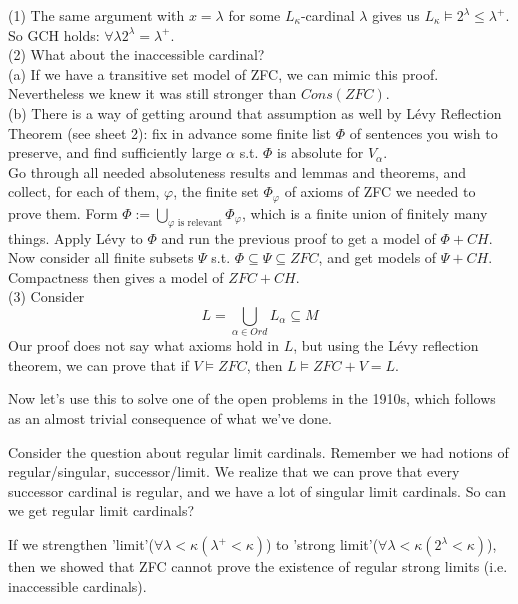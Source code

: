 \documentclass[a4paper]{article}
\begin{document}
\begin{rem}
(1) The same argument with $x=\lambda$ for some $L_\kappa$-cardinal $\lambda$ gives us $L_\kappa \vDash 2^\lambda \leq \lambda^+$. So GCH holds: $\forall \lambda 2^\lambda = \lambda^+$.\\
(2) What about the inaccessible cardinal?\\
(a) If we have a transitive set model of ZFC, we can mimic this proof. Nevertheless we knew it was still stronger than $Cons(ZFC)$.\\
(b) There is a way of getting around that assumption as well by L\'{e}vy Reflection Theorem (see sheet 2): fix in advance some finite list $\Phi$ of sentences you wish to preserve, and find sufficiently large $\alpha$ s.t. $\Phi$ is absolute for $V_\alpha$.\\
Go through all needed absoluteness results and lemmas and theorems, and collect, for each of them, $\varphi$, the finite set $\Phi_\varphi$ of axioms of ZFC we needed to prove them. Form $\Phi:=\bigcup_{\varphi \text{ is relevant}} \Phi_\varphi$, which is a finite union of finitely many things. Apply L\'{e}vy to $\Phi$ and run the previous proof to get a model of $\Phi+CH$.\\
Now consider all finite subsets $\Psi$ s.t. $\Phi \subseteq \Psi \subseteq ZFC$, and get models of $\Psi+CH$. Compactness then gives a model of $ZFC+CH$.\\
(3) Consider 
\[
L=\bigcup_{\alpha \in Ord} L_\alpha \subseteq M
\]
Our proof does not say what axioms hold in $L$, but using the L\'{e}vy reflection theorem, we can prove that if $V \vDash ZFC$, then $L \vDash ZFC+V=L$.
\end{rem}

Now let's use this to solve one of the open problems in the 1910s, which follows as an almost trivial consequence of what we've done.

Consider the question about regular limit cardinals. Remember we had notions of regular/singular, successor/limit. We realize that we can prove that every successor cardinal is regular, and we have a lot of singular limit cardinals. So can we get regular limit cardinals?

If we strengthen 'limit'($\forall \lambda<\kappa(\lambda^+<\kappa)$) to 'strong limit'($\forall \lambda < \kappa(2^\lambda<\kappa)$), then we showed that ZFC cannot prove the existence of regular strong limits (i.e. inaccessible cardinals).
\end{document}
